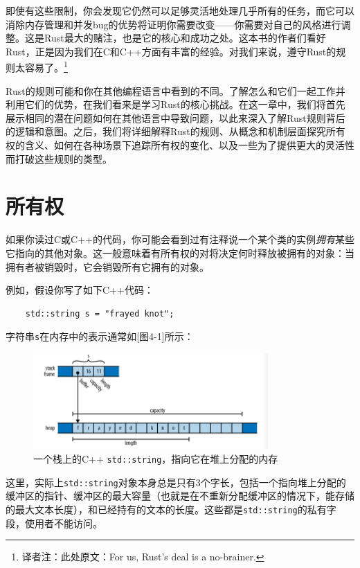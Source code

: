 即使有这些限制，你会发现它仍然可以足够灵活地处理几乎所有的任务，而它可以消除内存管理和并发bug的优势将证明你需要改变——你需要对自己的风格进行调整。这是Rust最大的赌注，也是它的核心和成功之处。这本书的作者们看好Rust，正是因为我们在C和C++方面有丰富的经验。对我们来说，遵守Rust的规则太容易了。\footnote{译者注：此处原文：For us, Rust's deal is a no-brainer.}

Rust的规则可能和你在其他编程语言中看到的不同。了解怎么和它们一起工作并利用它们的优势，在我们看来是学习Rust的核心挑战。在这一章中，我们将首先展示相同的潜在问题如何在其他语言中导致问题，以此来深入了解Rust规则背后的逻辑和意图。之后，我们将详细解释Rust的规则、从概念和机制层面探究所有权的含义、如何在各种场景下追踪所有权的变化、以及一些为了提供更大的灵活性而打破这些规则的类型。

\section{所有权}

如果你读过C或C++的代码，你可能会看到过有注释说一个某个类的实例\emph{拥有}某些它指向的其他对象。这一般意味着有所有权的对将决定何时释放被拥有的对象：当拥有者被销毁时，它会销毁所有它拥有的对象。

例如，假设你写了如下C++代码：
\begin{verbatim}
    std::string s = "frayed knot";
\end{verbatim}

字符串\texttt{s}在内存中的表示通常如\hyperref[f4-1][图4-1]所示：
\begin{figure}
    \centering
    \includegraphics[width=0.8\textwidth]{../img/f4-1.png}
    \caption{一个栈上的C++ \texttt{std::string}，指向它在堆上分配的内存}
    \label{f4-1}
\end{figure}

这里，实际上\texttt{std::string}对象本身总是只有3个字长，包括一个指向堆上分配的缓冲区的指针、缓冲区的最大容量（也就是在不重新分配缓冲区的情况下，能存储的最大文本长度），和已经持有的文本的长度。这些都是\texttt{std::string}的私有字段，使用者不能访问。

